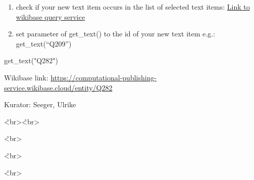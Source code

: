 \documentclass[
  a4paper,
]{book}
\newenvironment{Shaded}{\begin{snugshade}}{\end{snugshade}}
\newcommand{\NormalTok}[1]{\textcolor[rgb]{0.00,0.23,0.31}{#1}}
\newcommand{\StringTok}[1]{\textcolor[rgb]{0.13,0.47,0.30}{#1}}
\begin{document}
\begin{enumerate}
\def\labelenumi{\arabic{enumi}.}
\setcounter{enumi}{1}
\item
  check if your new text item occurs in the list of selected text items:
  \href{https://computational-publishing-service.wikibase.cloud/query/\#PREFIX\%20cps\%3A\%20\%3Chttps\%3A\%2F\%2Fcomputational-publishing-service.wikibase.cloud\%2Fentity\%2F\%3E\%0APREFIX\%20cpss\%3A\%20\%3Chttps\%3A\%2F\%2Fcomputational-publishing-service.wikibase.cloud\%2Fentity\%2Fstatement\%2F\%3E\%0APREFIX\%20cpsv\%3A\%20\%3Chttps\%3A\%2F\%2Fcomputational-publishing-service.wikibase.cloud\%2Fvalue\%2F\%3E\%0APREFIX\%20cpspt\%3A\%20\%3Chttps\%3A\%2F\%2Fcomputational-publishing-service.wikibase.cloud\%2Fprop\%2Fdirect\%2F\%3E\%0APREFIX\%20cpsp\%3A\%20\%3Chttps\%3A\%2F\%2Fcomputational-publishing-service.wikibase.cloud\%2Fprop\%2F\%3E\%0APREFIX\%20cpsps\%3A\%20\%3Chttps\%3A\%2F\%2Fcomputational-publishing-service.wikibase.cloud\%2Fprop\%2Fstatement\%2F\%3E\%0APREFIX\%20cpspq\%3A\%20\%3Chttps\%3A\%2F\%2Fcomputational-publishing-service.wikibase.cloud\%2Fprop\%2Fqualifier\%2F\%3E\%0A\%0ASELECT\%20\%3FtextItem\%20\%3FkuratorLabel\%20\%3FtextUrl\%0AWHERE\%0A\%7B\%0A\%20\%20\%3FtextItem\%20cpsp\%3AP46\%20\%3FkuratorStatement.\%20\%0A\%20\%20\%3FkuratorStatement\%20cpsps\%3AP46\%20\%3FkuratorItem.\%20\%0A\%20\%20\%3FkuratorItem\%20rdfs\%3Alabel\%20\%3FkuratorLabel.\%0A\%20\%20\%3FtextItem\%20cpsp\%3AP57\%20\%3Furlstatement.\%20\%0A\%20\%20\%3Furlstatement\%20cpsps\%3AP57\%20\%3FtextUrl.\%20\%0A\%7D}{Link
  to wikibase query service}
\item
  set parameter of get\_text() to the id of your new text item e.g.:
  get\_text(``Q209'')
\end{enumerate}

\begin{Shaded}
\begin{Highlighting}[]
\NormalTok{get\_text(}\StringTok{"Q282"}\NormalTok{)}
\end{Highlighting}
\end{Shaded}

Wikibase link:
\url{https://computational-publishing-service.wikibase.cloud/entity/Q282}

Kurator: Seeger, Ulrike

\r<br\textgreater{}\r<br\textgreater{}

\r<br\textgreater{}

\r<br\textgreater{}

\r<br\textgreater{}
\end{document}
